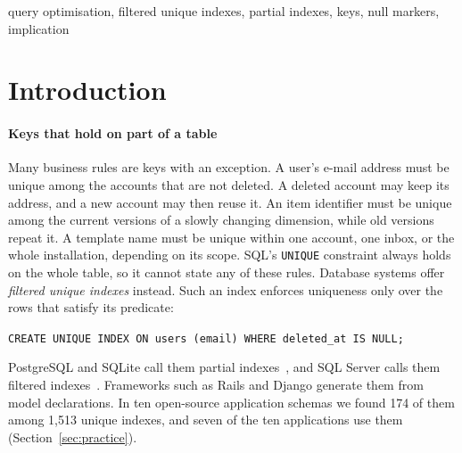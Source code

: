 \documentclass[conference]{IEEEtran}
\theoremstyle{definition}
\newcommand{\sql}[1]{\texttt{#1}}
\begin{document}
\begin{IEEEkeywords}
query optimisation, filtered unique indexes, partial indexes, keys, null markers, implication
\end{IEEEkeywords}

\section{Introduction}\label{sec:intro}

\paragraph*{Keys that hold on part of a table} Many business rules are keys with an exception. A user's
e-mail address must be unique among the accounts that are not deleted. A deleted account may keep its address,
and a new account may then reuse it. An item identifier must be unique among the current versions of a slowly
changing dimension, while old versions repeat it. A template name must be unique within one account, one inbox,
or the whole installation, depending on its scope. SQL's \sql{UNIQUE} constraint always holds on the whole table,
so it cannot state any of these rules. Database systems offer \emph{filtered unique indexes} instead. Such an
index enforces uniqueness only over the rows that satisfy its predicate:
\begin{center}
\sql{CREATE UNIQUE INDEX ON users (email) WHERE deleted\_at IS NULL;}
\end{center}
PostgreSQL and SQLite call them partial indexes~\cite{Sto89,PGDoc,SQLiteDoc}, and SQL Server calls them filtered
indexes~\cite{SQLServerDoc}. Frameworks such as Rails and Django generate them from model declarations. In ten
open-source application schemas we found 174 of them among 1{,}513 unique indexes, and seven of the
ten applications use them (Section~\ref{sec:practice}).
\end{document}
